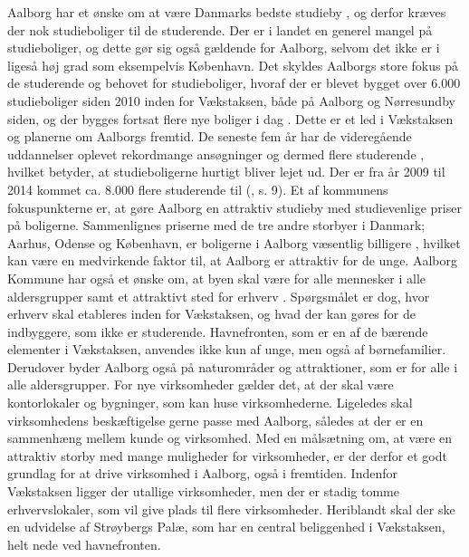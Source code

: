 \newline
\newline
Aalborg har et ønske om at være Danmarks bedste studieby \citep{ungdom}, og derfor kræves der nok studieboliger til de studerende. Der er i landet en generel mangel på studieboliger, og dette gør sig også gældende for Aalborg, selvom det ikke er i ligeså høj grad som eksempelvis København. Det skyldes Aalborgs store fokus på de studerende og behovet for studieboliger, hvoraf der er blevet bygget over 6.000 studieboliger siden 2010 inden for Vækstaksen, både på Aalborg og Nørresundby siden, og der bygges fortsat flere nye boliger i dag \citep{studieboliger}. Dette er et led i Vækstaksen og planerne om Aalborgs fremtid. De seneste fem år har de videregående uddannelser oplevet rekordmange ansøgninger og dermed flere studerende \citep{uddannelser}, hvilket betyder, at studieboligerne hurtigt bliver lejet ud. Der er fra år 2009 til 2014 kommet ca. 8.000 flere studerende til (\citep{unital}, s. 9). Et af kommunens fokuspunkterne er, at gøre Aalborg en attraktiv studieby med studievenlige priser på boligerne. Sammenlignes priserne med de tre andre storbyer i Danmark; Aarhus, Odense og København, er boligerne i Aalborg væsentlig billigere \citep{home}, hvilket kan være en medvirkende faktor til, at Aalborg er attraktiv for de unge.
\newline
\newline
Aalborg Kommune har også et ønske om, at byen skal være for alle mennesker i alle aldersgrupper samt et attraktivt sted for erhverv \citep{kl}\citep{kommuneplan3}. Spørgsmålet er dog, hvor erhverv skal etableres inden for Vækstaksen, og hvad der kan gøres for de indbyggere, som ikke er studerende. Havnefronten, som er en af de bærende elementer i Vækstaksen, anvendes ikke kun af unge, men også af børnefamilier. Derudover byder Aalborg også på naturområder og attraktioner, som er for alle i alle aldersgrupper.
\newline
\newline
For nye virksomheder gælder det, at der skal være kontorlokaler og bygninger, som kan huse virksomhederne. Ligeledes skal virksomhedens beskæftigelse gerne passe med Aalborg, således at der er en sammenhæng mellem kunde og virksomhed. Med en målsætning om, at være en attraktiv storby med mange muligheder for virksomheder, er der derfor et godt grundlag for at drive virksomhed i Aalborg, også i fremtiden. Indenfor Vækstaksen ligger der utallige virksomheder, men der er stadig tomme erhvervslokaler, som vil give plads til flere virksomheder. Heriblandt skal der ske en udvidelse af Strøybergs Palæ, som har en central beliggenhed i Vækstaksen, helt nede ved havnefronten.

